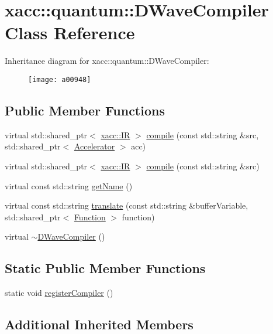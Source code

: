 \hypertarget{a00948}{}\section{xacc\+:\+:quantum\+:\+:D\+Wave\+Compiler Class Reference}
\label{a00948}
Inheritance diagram for xacc\+:\+:quantum\+:\+:D\+Wave\+Compiler\+:\begin{figure}[H]
\begin{center}
\leavevmode
\texttt{[image: a00948]}
\end{center}
\end{figure}
\subsection*{Public Member Functions}
\begin{DoxyCompactItemize}
\item 
virtual std\+::shared\+\_\+ptr$<$ \hyperlink{a01148}{xacc\+::\+IR} $>$ \hyperlink{a00948_a0f7f6b10b4a881cb27b36eaa6d39e7b1}{compile} (const std\+::string \&src, std\+::shared\+\_\+ptr$<$ \hyperlink{a01084}{Accelerator} $>$ acc)
\item 
virtual std\+::shared\+\_\+ptr$<$ \hyperlink{a01148}{xacc\+::\+IR} $>$ \hyperlink{a00948_a893e1d1c81a8aaf6e2435c9bceab575e}{compile} (const std\+::string \&src)
\item 
virtual const std\+::string \hyperlink{a00948_a8a180031ae563e1a9aac611e8066c181}{get\+Name} ()
\item 
virtual const std\+::string \hyperlink{a00948_a73a8839c55d22c68e5264feca8d626d4}{translate} (const std\+::string \&buffer\+Variable, std\+::shared\+\_\+ptr$<$ \hyperlink{a01124}{Function} $>$ function)
\item 
virtual \hyperlink{a00948_acc0ab28f787b8f4cbeb63c594a247e50}{$\sim$\+D\+Wave\+Compiler} ()
\end{DoxyCompactItemize}
\subsection*{Static Public Member Functions}
\begin{DoxyCompactItemize}
\item 
static void \hyperlink{a00948_a5b221649f22a9bb4d4a304a6522d071f}{register\+Compiler} ()
\end{DoxyCompactItemize}
\subsection*{Additional Inherited Members}


